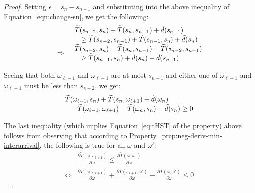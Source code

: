 \begin{proof}
\noindent Setting $\epsilon = s_{n} - s_{n-1}$ and substituting into the above inequality of Equation~\ref{eqn:change-sn}, we get the following:
\begin{equation}\label{eqn:change-sn2}
\begin{array}{ll}
     &\begin{array}{ll}
        \lefteqn{\widetilde{T}(s_{n-2},s_{n}) + \widetilde{T}(s_{n}, s_{n-1}) + \tilde{d}(s_{n-1})}& \\
        &\geq \widetilde{T}(s_{n-2},s_{n-1}) + \widetilde{T}(s_{n-1}, s_{n}) + \tilde{d}(s_{n}) 
    \end{array}\\
    \Rightarrow&
    \begin{array}{ll}
        \lefteqn{\widetilde{T}(s_{n-2},s_{n}) + \widetilde{T}(s_{n}, s_{n-1}) - \widetilde{T}(s_{n-2},s_{n-1})}& \\
        &\geq \widetilde{T}(s_{n-1}, s_{n}) + \tilde{d}(s_{n}) - \tilde{d}(s_{n-1})
    \end{array}\\
\end{array}
\end{equation}

Seeing that both $\omega_{\ell-1}$ and $\omega_{\ell+1}$ are at most $s_{n-1}$ and either one of $\omega_{\ell-1}$ and $\omega_{\ell+1}$  must be less than $s_{n-2}$, we get:
\begin{equation}
\begin{array}{ll}
    \lefteqn{\widetilde{T}(\omega_{\ell-1}, s_n)  +\widetilde{T}(s_n,\omega_{\ell+1}) + \tilde{d}(\omega_n)} &\\
    &- \widetilde{T}(\omega_{\ell-1},\omega_{\ell+1}) - \widetilde{T}(\omega_n, s_{n})  - \tilde{d}(s_n) \geq 0
\end{array}
\end{equation}

\noindent The last inequality (which implies Equation~\ref{eq:tHST} of the property) above follows from observing that according to Property~\ref{prop:neg-deriv-min-interarrival}, the following is true for all $\omega$ and $\omega'$:
\begin{equation}
\begin{array}{ll}
        &\frac{\partial \widetilde{T}(\omega,s_{k+1})}{\partial \omega}
            \leq \frac{\partial \widetilde{T}(\omega,\omega')}{\partial \omega} \nonumber\\
        \Leftrightarrow&
        \frac{\partial \widetilde{T}(\omega,s_{k+1})}{\partial \omega} + \frac{\partial \widetilde{T}(s_{k+1},\omega')}{\partial \omega} - \frac{\partial \widetilde{T}(\omega,\omega')}{\partial \omega} \leq 0 \nonumber  
\end{array}
\end{equation}
\end{proof}